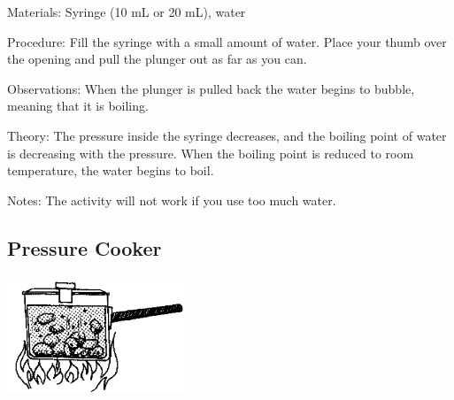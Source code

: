 \begin{multicols}{2}
\begin{description*}
\item[Materials:]{Syringe (10 mL or 20 mL), water}
\item[Procedure:]{Fill the syringe with a small amount of water. Place your thumb over the opening and pull the plunger out as far as you can.}
\item[Observations:]{When the plunger is pulled back the water begins to bubble, meaning that it is boiling.}
\item[Theory:]{The pressure inside the syringe decreases, and the boiling point of water is decreasing with the pressure. When the boiling point is reduced to room temperature, the water begins to boil.}
\item[Notes:]{The activity will not work if you use too much water.}
\end{description*}

\subsection{Pressure Cooker}

\begin{center}
\includegraphics[width=0.4\textwidth]{./img/source/pressure-cooker.png}
\end{center}


\end{multicols}
